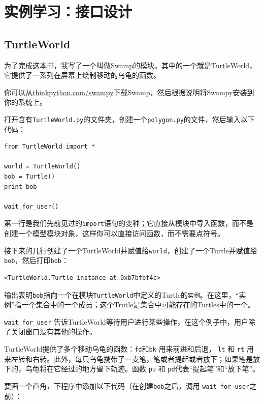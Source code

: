 \chapter{实例学习：接口设计}
\label{turtlechap}

\section{TurtleWorld}

为了完成这本书，我写了一个叫做Swamp的模块。其中的一个就是TurtleWorld，它提供了一系列在屏幕上绘制移动的乌龟的函数。

你可以从\url{thinkpython.com/swampy}下载Swamp，然后根据说明将Swampy安装到你的系统上。

打开含有{\tt TurtleWorld.py}的文件夹，创建一个{\tt polygon.py}的文件，然后输入以下代码：

\beforeverb
\begin{verbatim}
from TurtleWorld import *

world = TurtleWorld()
bob = Turtle()
print bob

wait_for_user()
\end{verbatim}
\afterverb
%
第一行是我们先前见过的{\tt import}语句的变种；它直接从模块中导入函数，而不是创建一个模型模块对象，这样你可以直接访问函数，而不需要点符号。


接下来的几行创建了一个TurtleWorld并赋值给{\tt world}，创建了一个Turtle并赋值给{\tt bob}，然后打印{\tt bob}：

\beforeverb
\begin{verbatim}
<TurtleWorld.Turtle instance at 0xb7bfbf4c>
\end{verbatim}
\afterverb
%
输出表明{\tt bob}指向一个在模块{\tt TurtleWorld}中定义的Turtle的{\tt 实例}。在这里，“实例”指一个集合中的一个成员；这个Trutle是集合中可能存在的Turtles中的一个。


\verb"wait_for_user" 告诉TurtleWorld等待用户进行某些操作，在这个例子中，用户除了关闭窗口没有其他的操作。

TurtleWorld提供了多个移动乌龟的函数：{\tt fd}和{\tt bk} 用来前进和后退， {\tt lt} 和 {\tt rt} 用来左转和右转。此外，每只乌龟携带了一支笔，笔或者提起或者放下；如果笔是放下的，乌龟将在它经过的地方留下轨迹。函数 {\tt pu} 和 {\tt pd}代表“提起笔”和“放下笔”。

要画一个直角，下程序中添加以下代码（在创建{\tt bob}之后，调用 \verb"wait_for_user"之前）：

